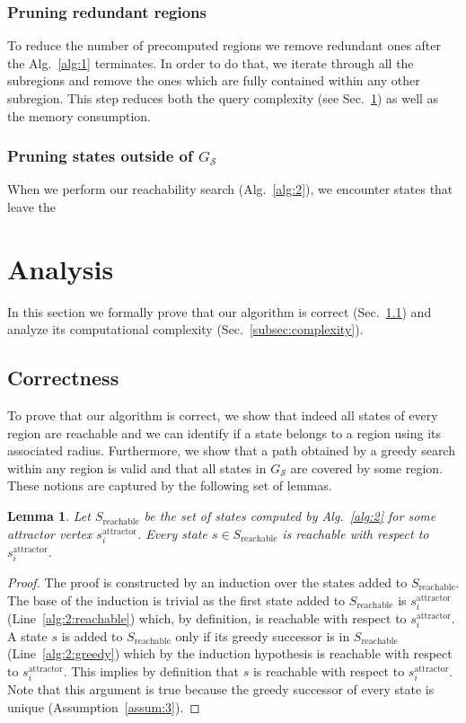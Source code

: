 \documentclass[letterpaper]{article} %
\newcommand{\calS}{\ensuremath{\mathcal{S}}\xspace}
\newcommand{\sAttract}{\ensuremath{s^{\text{attractor}}_i}\xspace}
\newtheorem{lemma}{Lemma}
\begin{document}
\subsubsection{Pruning redundant regions}
To reduce the number of precomputed regions we remove redundant ones after the Alg.~\ref{alg:1} terminates. 
In order to do that, we iterate through all the subregions and remove the ones which are fully contained within any other subregion. 
This step reduces both the query complexity (see Sec.~\ref{sec:analysis}) as well as the memory consumption.

\subsubsection{Pruning states outside of $G_\calS$}
When we perform our reachability search (Alg.~\ref{alg:2}), we encounter states that leave the 

\section {Analysis}
\label{sec:analysis}
In this section we formally prove that 
our algorithm is correct (Sec.~\ref{subsec:correct}) and 
analyze its computational complexity (Sec.~\ref{subsec:complexity}).

\subsection{Correctness}
\label{subsec:correct}
To prove that our algorithm is correct, we show that indeed all states of every region are reachable and we can identify if a state belongs to a region using its associated radius.
Furthermore, we show that a path obtained by a greedy search within any region is valid and that all states in $G_\calS$ are covered by some region.
These notions are captured by the following set of lemmas.

\vspace{2mm}
\begin{lemma}
\label{lemma:reachable-1}
Let $S_{\text{reachable}}$ be the set of states computed by Alg.~\ref{alg:2} for some attractor vertex \sAttract.
%
Every state $s \in S_{\text{reachable}}$ is reachable with respect to \sAttract.
\end{lemma}
%
\begin{proof}
The proof is constructed by an induction over the states added to $S_{\text{reachable}}$.
The base of the induction is trivial as the first state added to $S_{\text{reachable}}$  is \sAttract (Line~\ref{alg:2:reachable}) which, by definition, is reachable with respect to \sAttract.
%
A state $s$ is added to $S_{\text{reachable}}$ only if its greedy successor is in $S_{\text{reachable}}$ (Line~\ref{alg:2:greedy}) which by the induction hypothesis is reachable with respect to \sAttract.
This implies by definition that $s$ is reachable with respect to \sAttract.
%
Note that this argument is true because the greedy successor of every state is unique (Assumption~\ref{assum:3}).
\end{proof}
\end{document}
